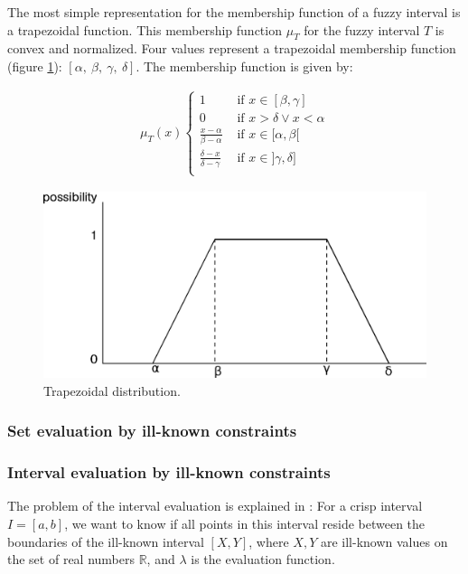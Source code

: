 The most simple representation for the membership function of a fuzzy interval is a trapezoidal function. This membership function $\mu_T$ for the fuzzy interval $T$ is convex and normalized. Four values represent a trapezoidal membership function (figure  \ref{fig:trapezoidal}): $\left[\alpha,\ \beta,\ \gamma,\ \delta\right]$. The membership function is given by:

\begin{align}
\mu_T(x)
\begin{cases}
1 & \mbox{ if } x \in [\beta,\gamma] \\
0 & \mbox{ if } x > \delta \vee x < \alpha \\
\frac{x-\alpha}{\beta - \alpha} & \mbox{ if } x \in [\alpha,\beta[ \\
\frac{\delta -x}{\delta - \gamma} & \mbox{ if } x \in ]\gamma,\delta] \\
\end{cases}
\end{align}

\begin{figure}[h!]
  \centering
  \includegraphics[scale=0.4]{graphs/trapezoidalDistribution.eps}
  \caption{Trapezoidal distribution.}
  \label{fig:trapezoidal}
\end{figure}

\subsubsection{Set evaluation by ill-known constraints}

\subsubsection{Interval evaluation by ill-known constraints}
The problem of the interval evaluation is explained in \cite{Pon11}: For a crisp interval $I = \left[ a, b \right]$, we want to know if all points in this interval reside between the boundaries of the ill-known interval $\left[ X , Y \right]$, where $X,Y$ are ill-known values on the set of real numbers $\mathbb{R}$, and $\lambda$ is the evaluation function.

